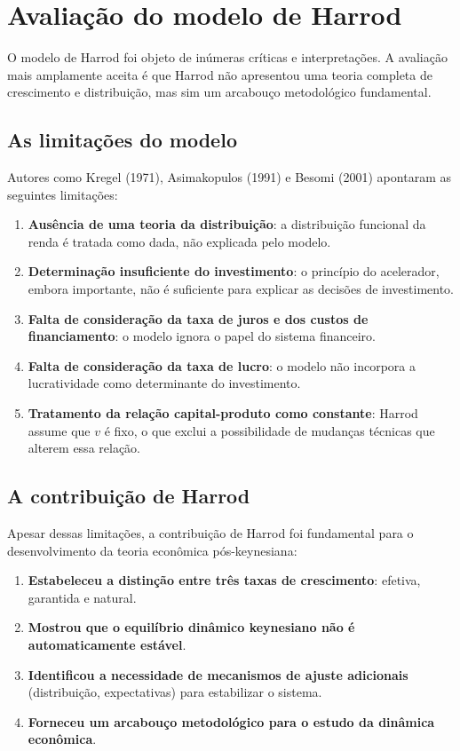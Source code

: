 \documentclass[
  brazilian,
  letterpaper,
  DIV=11,
  numbers=noendperiod]{scrreprt}
\providecommand{\tightlist}{%
  \setlength{\itemsep}{0pt}\setlength{\parskip}{0pt}}
\begin{document}
\section{Avaliação do modelo de Harrod}\label{sec-avaliacao-harrod}

O modelo de Harrod foi objeto de inúmeras críticas e interpretações. A
avaliação mais amplamente aceita é que Harrod não apresentou uma teoria
completa de crescimento e distribuição, mas sim um arcabouço
metodológico fundamental.

\subsection{As limitações do
modelo}\label{as-limitauxe7uxf5es-do-modelo}

Autores como Kregel (1971), Asimakopulos (1991) e Besomi (2001)
apontaram as seguintes limitações:

\begin{enumerate}
\def\labelenumi{\arabic{enumi}.}
\tightlist
\item
  \textbf{Ausência de uma teoria da distribuição}: a distribuição
  funcional da renda é tratada como dada, não explicada pelo modelo.
\item
  \textbf{Determinação insuficiente do investimento}: o princípio do
  acelerador, embora importante, não é suficiente para explicar as
  decisões de investimento.
\item
  \textbf{Falta de consideração da taxa de juros e dos custos de
  financiamento}: o modelo ignora o papel do sistema financeiro.
\item
  \textbf{Falta de consideração da taxa de lucro}: o modelo não
  incorpora a lucratividade como determinante do investimento.
\item
  \textbf{Tratamento da relação capital-produto como constante}: Harrod
  assume que \(v\) é fixo, o que exclui a possibilidade de mudanças
  técnicas que alterem essa relação.
\end{enumerate}

\subsection{A contribuição de
Harrod}\label{a-contribuiuxe7uxe3o-de-harrod}

Apesar dessas limitações, a contribuição de Harrod foi fundamental para
o desenvolvimento da teoria econômica pós-keynesiana:

\begin{enumerate}
\def\labelenumi{\arabic{enumi}.}
\tightlist
\item
  \textbf{Estabeleceu a distinção entre três taxas de crescimento}:
  efetiva, garantida e natural.
\item
  \textbf{Mostrou que o equilíbrio dinâmico keynesiano não é
  automaticamente estável}.
\item
  \textbf{Identificou a necessidade de mecanismos de ajuste adicionais}
  (distribuição, expectativas) para estabilizar o sistema.
\item
  \textbf{Forneceu um arcabouço metodológico para o estudo da dinâmica
  econômica}.
\end{enumerate}
\end{document}
